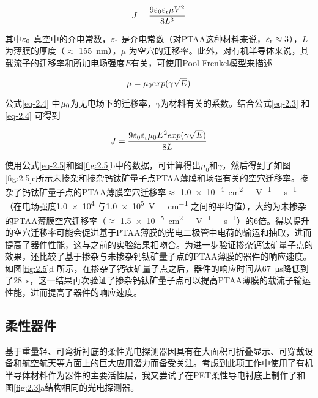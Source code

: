 \documentclass[forlib]{WHUMaster}   %
\begin{document}
{\begin{equation}\label{eq-2.3}
{J = \frac{{9}\varepsilon_{\rm{0}}\varepsilon_{\rm{r}}\mu V^2}{8L^3}}
\end{equation}

其中$\varepsilon_{\rm{0}}$ 真空中的介电常数，$\varepsilon_{\rm{r}}$ 是介电常数（对PTAA这种材料来说，$\varepsilon_{\rm{r}} \approx 3$），$L$ 为薄膜的厚度（$\approx$ 155\ nm），$\mu$ 为空穴的迁移率。此外，对有机半导体来说，其载流子的迁移率和所加电场强度$E$有关，可使用Pool-Frenkel模型\cite{RN5}来描述

\begin{equation}\label{eq-2.4}
\mu = \mu_{\rm{0}}exp(\gamma\sqrt{E})
\end{equation}

公式\ref{eq-2.4} 中$\mu_{\rm{0}}$为无电场下的迁移率，$\gamma$为材料有关的系数。结合公式\ref{eq-2.3} 和\ref{eq-2.4} 可得到

\begin{equation}\label{eq-2.5}
J = \frac{9\varepsilon_{\rm{0}}\varepsilon_{\rm{r}}\mu_0E^2exp(\gamma\sqrt{E})}{8L}
\end{equation}

使用公式\ref{eq-2.5}和图\ref{fig:2.5}b中的数据，可计算得出$\mu_0$和$\gamma$，然后得到了如图\ref{fig:2.5}c所示未掺杂和掺杂钙钛矿量子点PTAA薄膜和场强有关的空穴迁移率。掺杂了钙钛矿量子点的PTAA薄膜空穴迁移率$\approx$ \num{1.0e-4}\ \si{cm^2\ V^{-1}\ s^{-1}}（在电场强度\num{1.0e4} 与\num{1.0e5}\ \si{V \ cm^{-1}} 之间的平均值），大约为未掺杂的PTAA薄膜空穴迁移率（$\approx$ \num{1.5e-5}\ \si{cm^2\ V^{-1}\ s^{-1}}）的6倍。得以提升的空穴迁移率可能会促进基于PTAA薄膜的光电二极管中电荷的输运和抽取，进而提高了器件性能，这与之前的实验结果相吻合。为进一步验证掺杂钙钛矿量子点的效果，还比较了基于掺杂与未掺杂钙钛矿量子点的PTAA薄膜的器件的响应速度。如图\ref{fig:2.5}d 所示，在掺杂了钙钛矿量子点之后，器件的响应时间从67\ μs降低到了28\ s，这一结果再次验证了掺杂钙钛矿量子点可以提高PTAA薄膜的载流子输运性能，进而提高了器件的响应速度。

\subsection{柔性器件}

基于重量轻、可弯折衬底的柔性光电探测器因具有在大面积可折叠显示、可穿戴设备和航空航天等方面上的巨大应用潜力而备受关注\cite{RN184}。考虑到此项工作中使用了有机半导体材料作为器件的主要活性层，我又尝试了在PET柔性导电衬底上制作了和图\ref{fig:2.3}a结构相同的光电探测器。

}
\end{document}
